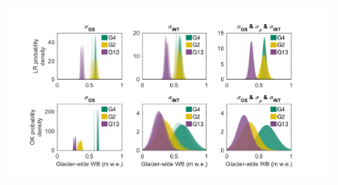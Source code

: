\documentclass[review,oneside, letterpaper]{igs} %
\providecommand{\DIFaddend}{} %
\providecommand{\DIFaddbeginFL}{} %
\providecommand{\DIFaddendFL}{} %
\providecommand{\DIFdelbeginFL}{} %
\providecommand{\DIFdelendFL}{} %
\newcommand{\DIFscaledelfig}{0.5}
\newlength{\DIFdelgraphicswidth} %
\newlength{\DIFdelgraphicsheight} %
\newcommand{\DIFaddincludegraphics}[2][]{{\color{blue}\fbox{\DIFOincludegraphics[#1]{#2}}}} %
\newcommand{\DIFdelincludegraphics}[2][]{%
\sbox{\DIFdelgraphicsbox}{\DIFOincludegraphics[#1]{#2}}%
\settoboxwidth{\DIFdelgraphicswidth}{\DIFdelgraphicsbox} %
\settoboxtotalheight{\DIFdelgraphicsheight}{\DIFdelgraphicsbox} %
\scalebox{\DIFscaledelfig}{%
\parbox[b]{\DIFdelgraphicswidth}{\usebox{\DIFdelgraphicsbox}\\[-\baselineskip] \rule{\DIFdelgraphicswidth}{0em}}\llap{\resizebox{\DIFdelgraphicswidth}{\DIFdelgraphicsheight}{%
\setlength{\unitlength}{\DIFdelgraphicswidth}%
\begin{picture}(1,1)%
\thicklines\linethickness{2pt} %
{\color[rgb]{1,0,0}\put(0,0){\framebox(1,1){}}}%
{\color[rgb]{1,0,0}\put(0,0){\line( 1,1){1}}}%
{\color[rgb]{1,0,0}\put(0,1){\line(1,-1){1}}}%
\end{picture}%
}\hspace*{3pt}}} %
} %
\DeclareRobustCommand{\DIFaddend}{\DIFOaddend \let\includegraphics\DIFOincludegraphics} %
\DeclareRobustCommand{\DIFaddbeginFL}{\DIFOaddbeginFL \let\includegraphics\DIFaddincludegraphics} %
\DeclareRobustCommand{\DIFaddendFL}{\DIFOaddendFL \let\includegraphics\DIFOincludegraphics} %
\DeclareRobustCommand{\DIFdelbeginFL}{\DIFOdelbeginFL \let\includegraphics\DIFdelincludegraphics} %
\DeclareRobustCommand{\DIFdelendFL}{\DIFOaddendFL \let\includegraphics\DIFOincludegraphics} %
\begin{document}
\DIFaddend \begin{figure}
	\centering
	\DIFdelbeginFL %
\DIFdelendFL \DIFaddbeginFL \includegraphics[width =0.95\textwidth]{WSMBDist.pdf}\DIFaddendFL \\

\end{figure}
\end{document}
